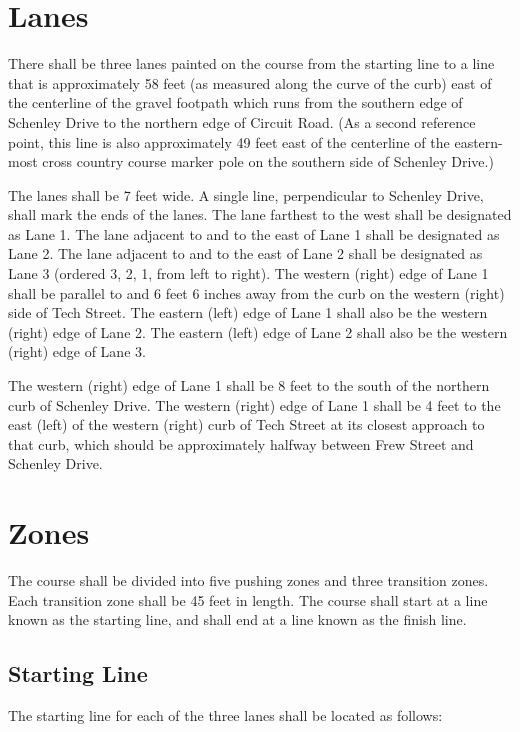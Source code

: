 \documentclass[openany]{book}
\begin{document}
\section{Lanes}

There shall be three lanes painted on the course from the starting line to a line that is approximately 58 feet (as measured along the curve of the curb) east of the centerline of the gravel footpath which runs from the southern edge of Schenley Drive to the northern edge of Circuit Road. (As a second reference point, this line is also approximately 49 feet east of the centerline of the eastern-most cross country course marker pole on the southern side of Schenley Drive.)

The lanes shall be 7 feet wide. A single line, perpendicular to Schenley Drive, shall mark the ends of the lanes. The lane farthest to the west shall be designated as Lane 1. The lane adjacent to and to the east of Lane 1 shall be designated as Lane 2. The lane adjacent to and to the east of Lane 2 shall be designated as Lane 3 (ordered 3, 2, 1, from left to right). The western (right) edge of Lane 1 shall be parallel to and 6 feet 6 inches away from the curb on the western (right) side of Tech Street. The eastern (left) edge of Lane 1 shall also be the western (right) edge of Lane 2. The eastern (left) edge of Lane 2 shall also be the western (right) edge of Lane 3.

The western (right) edge of Lane 1 shall be 8 feet to the south of the northern curb of Schenley Drive. The western (right) edge of Lane 1 shall be 4 feet to the east (left) of the western (right) curb of Tech Street at its closest approach to that curb, which should be approximately halfway between Frew Street and Schenley Drive.

\section{Zones}

The course shall be divided into five pushing zones and three transition zones. Each transition zone shall be 45 feet in length. The course shall start at a line known as the starting line, and shall end at a line known as the finish line.

\subsection{Starting Line}

The starting line for each of the three lanes shall be located as follows:
\end{document}

